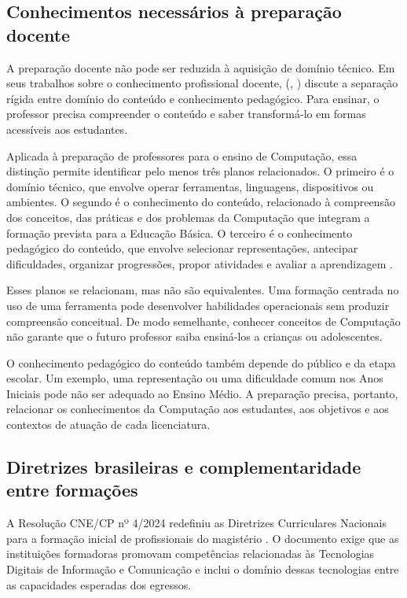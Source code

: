 \subsection{Conhecimentos necessários à preparação docente}
\label{subsec:conhecimentos-preparacao-docente}

A preparação docente não pode ser reduzida à aquisição de domínio técnico. Em seus trabalhos sobre o conhecimento profissional docente,  (\citeyear{shulman1986understanding}, \citeyear{shulman1987knowledge}) discute a separação rígida entre domínio do conteúdo e conhecimento pedagógico. Para ensinar, o professor precisa compreender o conteúdo e saber transformá-lo em formas acessíveis aos estudantes.

Aplicada à preparação de professores para o ensino de Computação, essa distinção permite identificar pelo menos três planos relacionados. O primeiro é o domínio técnico, que envolve operar ferramentas, linguagens, dispositivos ou ambientes. O segundo é o conhecimento do conteúdo, relacionado à compreensão dos conceitos, das práticas e dos problemas da Computação que integram a formação prevista para a Educação Básica. O terceiro é o conhecimento pedagógico do conteúdo, que envolve selecionar representações, antecipar dificuldades, organizar progressões, propor atividades e avaliar a aprendizagem \cite{saeli2011teaching,yadav2019computer}.

Esses planos se relacionam, mas não são equivalentes. Uma formação centrada no uso de uma ferramenta pode desenvolver habilidades operacionais sem produzir compreensão conceitual. De modo semelhante, conhecer conceitos de Computação não garante que o futuro professor saiba ensiná-los a crianças ou adolescentes.

O conhecimento pedagógico do conteúdo também depende do público e da etapa escolar. Um exemplo, uma representação ou uma dificuldade comum nos Anos Iniciais pode não ser adequado ao Ensino Médio. A preparação precisa, portanto, relacionar os conhecimentos da Computação aos estudantes, aos objetivos e aos contextos de atuação de cada licenciatura.

\subsection{Diretrizes brasileiras e complementaridade entre formações}
\label{subsec:diretrizes-complementaridade-formacao}

A Resolução CNE/CP nº 4/2024 redefiniu as Diretrizes Curriculares Nacionais para a formação inicial de profissionais do magistério \cite{brasil2024resolucao4}. O documento exige que as instituições formadoras promovam competências relacionadas às Tecnologias Digitais de Informação e Comunicação e inclui o domínio dessas tecnologias entre as capacidades esperadas dos egressos.

